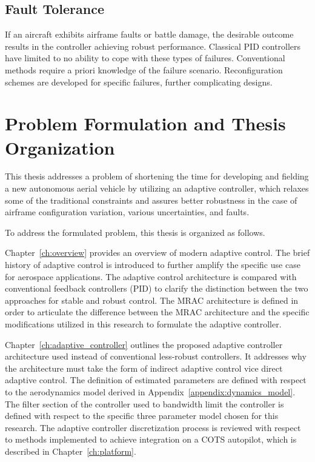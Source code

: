 \subsection{Fault Tolerance}
If an aircraft exhibits airframe faults or battle damage, the desirable outcome results in the controller achieving robust performance.  Classical \ac{PID} controllers have limited to no ability to cope with these types of failures.  Conventional methods require a priori knowledge of the failure scenario. Reconfiguration schemes are developed for specific failures, further complicating designs.

\section{Problem Formulation and Thesis Organization}

This thesis addresses a problem of shortening the time for developing and fielding a new autonomous aerial vehicle by utilizing an adaptive controller, which relaxes some of the traditional constraints and assures better robustness in the case of airframe configuration variation, various uncertainties, and faults.  

To address the formulated problem, this thesis is organized as follows.

Chapter~\ref{ch:overview} provides an overview of modern adaptive control.  The brief history of adaptive control is introduced to further amplify the specific use case for aerospace applications.  The adaptive control architecture is compared with conventional feedback controllers (\ac{PID}) to clarify the distinction between the two approaches for stable and robust control.  The \ac{MRAC} architecture is defined in order to articulate the difference between the \ac{MRAC} architecture and the specific modifications utilized in this research to formulate the \Lone adaptive controller.

Chapter~\ref{ch:adaptive_controller} outlines the proposed adaptive controller architecture used instead of conventional less-robust controllers.  It addresses why the architecture must take the form of indirect adaptive control vice direct adaptive control.  The definition of estimated parameters are defined with respect to the aerodynamics model derived in Appendix~\ref{appendix:dynamics_model}.  The filter section of the controller used to bandwidth limit the controller is defined with respect to the specific three parameter model chosen for this research.  The \Lone adaptive controller discretization process is reviewed with respect to methods implemented to achieve integration on a \ac{COTS} autopilot, which is described in Chapter~\ref{ch:platform}.

